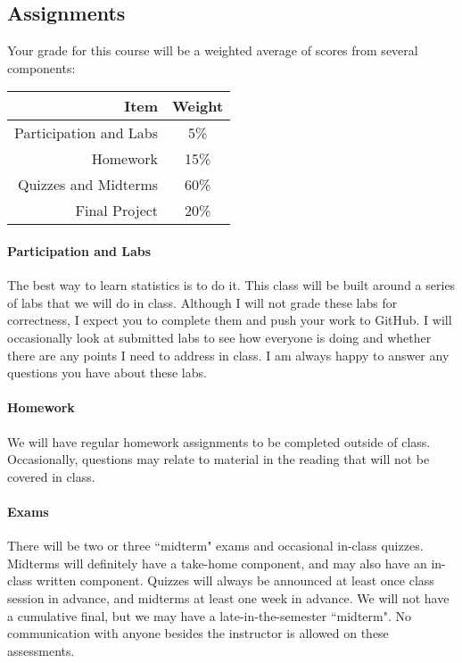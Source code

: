\documentclass[11pt]{article}
\begin{document}
\subsection*{Assignments}

Your grade for this course will be a weighted average of scores from several components:

\begin{table}[!h]
\centering
\begin{tabular}{r c}
\toprule
Item & Weight \\
\midrule
Participation and Labs & 5\% \\
\cmidrule(r){1-2}
Homework & 15\% \\
\cmidrule(r){1-2}
Quizzes and Midterms & 60\% \\
\cmidrule(r){1-2}
Final Project & 20\% \\
\bottomrule
\end{tabular}
\end{table}

\paragraph{Participation and Labs}
The best way to learn statistics is to do it.  This class will be built around a series of labs that we will do in class.  Although I will not grade these labs for correctness, I expect you to complete them and push your work to GitHub.  I will occasionally look at submitted labs to see how everyone is doing and whether there are any points I need to address in class.  I am always happy to answer any questions you have about these labs.

\paragraph{Homework}
We will have regular homework assignments to be completed outside of class.
Occasionally, questions may relate to material in the reading that will not be covered in class.

\paragraph{Exams}
There will be two or three ``midterm" exams and occasional in-class quizzes.
Midterms will definitely have a take-home component, and may also have an in-class written component.
Quizzes will always be announced at least once class session in advance, and midterms at least one week in advance.
We will not have a cumulative final, but we may have a late-in-the-semester ``midterm".
No communication with anyone besides the instructor is allowed on these assessments.
\end{document}

